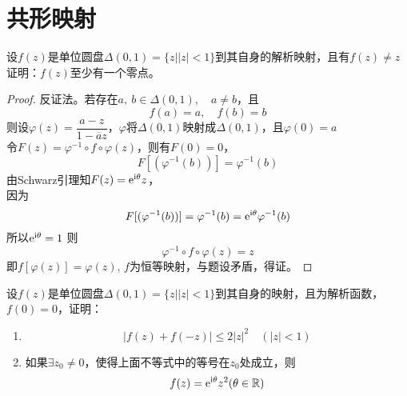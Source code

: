 \section{共形映射}

\begin{proposition}

    设$f(z)$是单位圆盘$\Delta(0,1) = \{z \big| |z| < 1 \}$到其自身的解析映射，且有$f(z) \neq z$\\
    证明：$f(z)$至少有一个零点。

\end{proposition}

\begin{proof}
    
    反证法。若存在$a,\ b\in \Delta(0,1), \quad a \neq b$，且
    $$f(a) = a, \quad  f(b) = b$$
    则设$\varphi(z) = \dfrac{a-z}{1-\overline{a}z}$，$\varphi$将$\Delta(0,1)$映射成$\Delta(0,1)$，且$\varphi(0) = a $\\
    令$F(z) = \varphi^{-1} \circ f \circ \varphi(z)$，则有$F(0) = 0$，
    $$F[(\varphi^{-1}(b))] = \varphi^{-1}(b)$$
    由\textup{Schwarz}引理知$F(z) = \mathrm{e}^{\mathrm{i \theta}}z$，\\
    因为
    $$F[(\varphi^{-1}(b))] = \varphi^{-1}(b) = \mathrm{e}^{\mathrm{i \theta}}\varphi^{-1}(b)$$
    所以$ \mathrm{e}^{\mathrm{i \theta}} = 1$
    则
    $$ \varphi^{-1} \circ f \circ \varphi(z) = z$$
    即$ f[\varphi(z)] = \varphi(z)$, $f$为恒等映射，与题设矛盾，得证。

\end{proof}

\begin{proposition}
    
    设$f(z)$是单位圆盘$\Delta(0,1) = \{z \big| |z| < 1 \}$到其自身的映射，且为解析函数，$f(0) = 0$，证明：
    
    \begin{enumerate}
        
        \item   $$|f(z) + f(-z)| \leq 2 |z|^2 \quad (|z| < 1)$$
        
        \item   如果$\exists z_0 \neq 0$，使得上面不等式中的等号在$z_0$处成立，则
                $$f(z) = \mathrm{e}^{\mathrm{i}\theta}z^2(\theta \in \mathbb{{R}})$$

    \end{enumerate}

\end{proposition}

